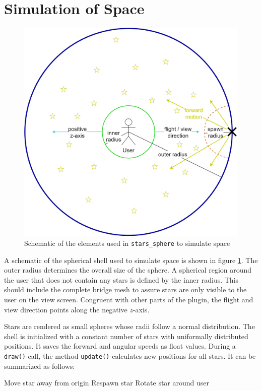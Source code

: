 \documentclass[hyperref, bachelorofscience]{cgvpub}
\begin{document}
\section{Simulation of Space} \label{sec:space}
\begin{figure}
	\centering
	\includegraphics[width=.7\linewidth]{../pics/stars_sphere_schema}
	\caption{Schematic of the elements used in \lstinline|stars_sphere| to simulate space}
	\label{fig:space}
\end{figure}

A schematic of the spherical shell used to simulate space is shown in figure \ref{fig:space}. The outer radius determines the overall size of the sphere. A spherical region around the user that does not contain any stars is defined by the inner radius. This should include the complete bridge mesh to assure stars are only visible to the user on the view screen. Congruent with other parts of the plugin, the flight and view direction points along the negative $ z $-axis. 

Stars are rendered as small spheres whose radii follow a normal distribution. The shell is initialized with a constant number of stars with uniformally distributed positions. It saves the forward and angular speeds as float values. During a \lstinline|draw()| call, the method \lstinline|update()| calculates new positions for all stars. It can be summarized as follows:

\begin{algorithmic}
		\State Move star away from origin
			\State Respawn star
		\Else
			\State Rotate star around user
		\EndIf
	\EndFor
\end{algorithmic}
\end{document}
